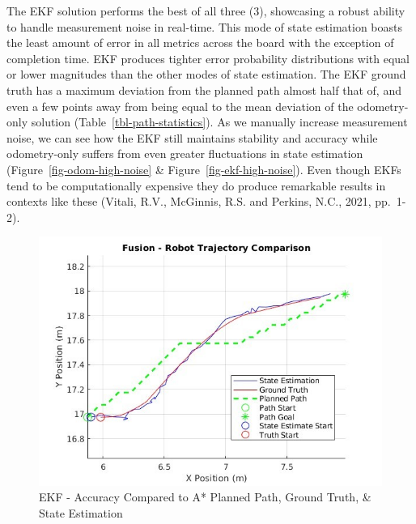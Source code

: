 \documentclass[
  letterpaper,
  DIV=11,
  numbers=noendperiod]{scrartcl}
\begin{document}
The EKF solution performs the best of all three (3), showcasing a robust
ability to handle measurement noise in real-time. This mode of state
estimation boasts the least amount of error in all metrics across the
board with the exception of completion time. EKF produces tighter error
probability distributions with equal or lower magnitudes than the other
modes of state estimation. The EKF ground truth has a maximum deviation
from the planned path almost half that of, and even a few points away
from being equal to the mean deviation of the odometry-only solution
(Table~\ref{tbl-path-statistics}). As we manually increase measurement
noise, we can see how the EKF still maintains stability and accuracy
while odometry-only suffers from even greater fluctuations in state
estimation (Figure~\ref{fig-odom-high-noise} \&
Figure~\ref{fig-ekf-high-noise}). Even though EKFs tend to be
computationally expensive they do produce remarkable results in contexts
like these (Vitali, R.V., McGinnis, R.S. and Perkins, N.C., 2021,
pp.~1-2).

\begin{figure}

{\centering \includegraphics{ekf-trajectory.png}

}

\caption{\label{fig-ekf-trajectory}EKF - Accuracy Compared to A* Planned
Path, Ground Truth, \& State Estimation}

\end{figure}
\end{document}
